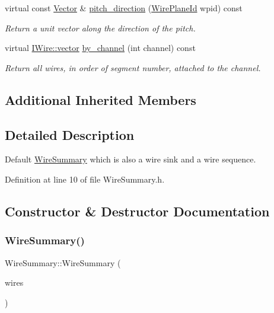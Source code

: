 \begin{DoxyCompactItemize}
\item 
virtual const \hyperlink{namespace_wire_cell_aa3c82d3ba85f032b0d278b7004846800}{Vector} \& \hyperlink{class_wire_cell_1_1_wire_summary_a0b38146487504f384c0a619db67f6e4a}{pitch\+\_\+direction} (\hyperlink{class_wire_cell_1_1_wire_plane_id}{Wire\+Plane\+Id} wpid) const
\begin{DoxyCompactList}\small\item\em Return a unit vector along the direction of the pitch. \end{DoxyCompactList}\item 
virtual \hyperlink{class_wire_cell_1_1_i_data_ae1a9f863380499bb43f39fabb6276660}{I\+Wire\+::vector} \hyperlink{class_wire_cell_1_1_wire_summary_ae627ae15980a5d2ea5dd0e3f8eb47fe8}{by\+\_\+channel} (int channel) const
\begin{DoxyCompactList}\small\item\em Return all wires, in order of segment number, attached to the channel. \end{DoxyCompactList}\end{DoxyCompactItemize}
\subsection*{Additional Inherited Members}


\subsection{Detailed Description}
Default \hyperlink{class_wire_cell_1_1_wire_summary}{Wire\+Summary} which is also a wire sink and a wire sequence. 

Definition at line 10 of file Wire\+Summary.\+h.



\subsection{Constructor \& Destructor Documentation}
\mbox{\label{class_wire_cell_1_1_wire_summary_ab5b972a7d546acd21b85b4e949bd0cec}} 
\subsubsection{\texorpdfstring{Wire\+Summary()}{WireSummary()}}
{\footnotesize\ttfamily Wire\+Summary\+::\+Wire\+Summary (\begin{DoxyParamCaption}\item[{const \hyperlink{class_wire_cell_1_1_i_data_ae1a9f863380499bb43f39fabb6276660}{I\+Wire\+::vector} \&}]{wires }\end{DoxyParamCaption})}



